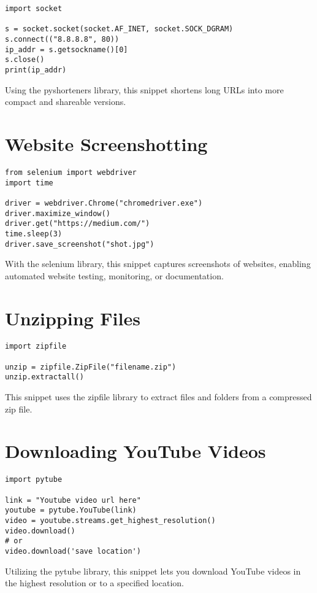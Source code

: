 \begin{lstlisting}
import socket

s = socket.socket(socket.AF_INET, socket.SOCK_DGRAM)
s.connect(("8.8.8.8", 80))
ip_addr = s.getsockname()[0]
s.close()
print(ip_addr)
\end{lstlisting}

Using the pyshorteners library, this snippet shortens long URLs into more compact and shareable versions.

\section{Website Screenshotting}

\begin{lstlisting}
from selenium import webdriver
import time

driver = webdriver.Chrome("chromedriver.exe")
driver.maximize_window()
driver.get("https://medium.com/")
time.sleep(3)
driver.save_screenshot("shot.jpg")
\end{lstlisting}

With the selenium library, this snippet captures screenshots of websites, enabling automated website testing, monitoring, or documentation.

\section{Unzipping Files}

\begin{lstlisting}
import zipfile

unzip = zipfile.ZipFile("filename.zip")
unzip.extractall()
\end{lstlisting}

This snippet uses the zipfile library to extract files and folders from a compressed zip file.

\section{Downloading YouTube Videos}

\begin{lstlisting}
import pytube

link = "Youtube video url here"
youtube = pytube.YouTube(link)
video = youtube.streams.get_highest_resolution()
video.download()
# or
video.download('save location')
\end{lstlisting}

Utilizing the pytube library, this snippet lets you download YouTube videos in the highest resolution or to a specified location.

